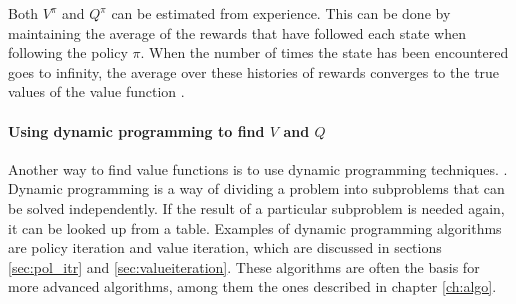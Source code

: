 Both $V^\pi$ and $Q^\pi$ can be estimated from experience. This can be done by
maintaining the average of the rewards that have followed each state when
following the policy $\pi$. When the number of times the state has been
encountered goes to infinity, the average over these histories of rewards
converges to the true values of the value function
\parencite{barto1998reinforcement}.

\paragraph{Using dynamic programming to find $V$ and $Q$}

Another way to find value functions is to use dynamic programming techniques. \parencite{bellman1957mdp}. Dynamic programming is a way of dividing a problem into subproblems that can be
solved independently. If the result of a particular subproblem is needed again,
it can be looked up from a table. Examples of dynamic programming algorithms are
policy iteration and value iteration, which are discussed in sections
\ref{sec:pol_itr} and \ref{sec:valueiteration}. These algorithms are often the
basis for more advanced algorithms, among them the ones described in chapter
\ref{ch:algo}. 



